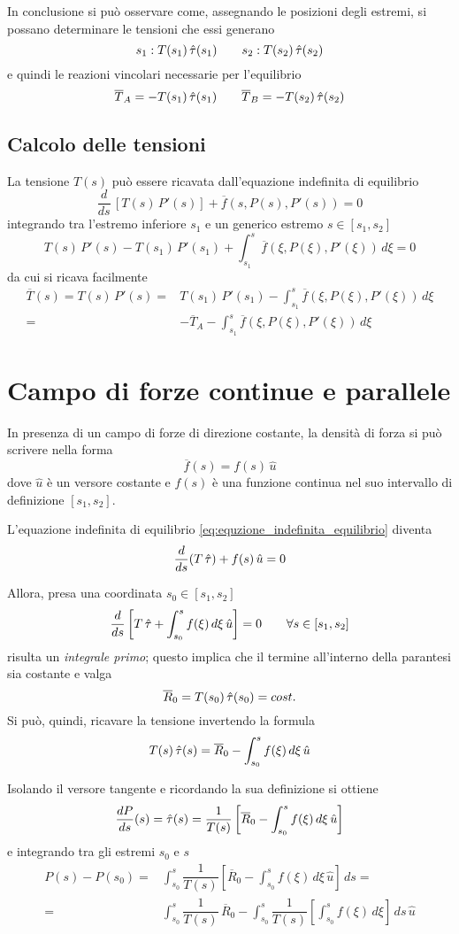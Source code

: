 In conclusione si può osservare come, assegnando le posizioni degli estremi, si possano determinare le tensioni che essi generano
\[
s_1: T(s_1)\,\hat{\tau}(s_1)\qquad s_2: T(s_2)\,\hat{\tau}(s_2)
\]
e quindi le reazioni vincolari necessarie per l'equilibrio
\[
\overline{T}_A = -	T(s_1)\,\hat{\tau}(s_1)\qquad \overline{T}_B = -T(s_2)\,\hat{\tau}(s_2)
\]

\subsection{Calcolo delle tensioni}
La tensione $T(s)$ può essere ricavata dall'equazione indefinita di equilibrio 
\[
\dfrac{d}{ds}\,\left[T(s)\,P'(s)\right] + \overline{f}(s, P(s), P'(s)) = 0
\] 
integrando tra l'estremo inferiore $s_1$ e un generico estremo $s \in [s_1, s_2]$
\[
T(s)\,P'(s) - T(s_1)\,P'(s_1) + \int_{s_1}^s \overline{f}(\xi, P(\xi), P'(\xi))\,d\xi = 0
\]
da cui si ricava facilmente
\begin{align*}
\overline{T}	(s) = T(s)\,P'(s) =& T(s_1)\,P'(s_1) - \int_{s_1}^s \overline{f}(\xi, P(\xi), P'(\xi))\,d\xi\\
=& - \overline{T}_A - \int_{s_1}^s \overline{f}(\xi, P(\xi), P'(\xi))\,d\xi 
\end{align*}



\section{Campo di forze continue e parallele}\label{section:forze_continue_parallele}
In presenza di un campo di forze di direzione costante, la densità di forza si può scrivere nella forma
\[
\overline{f}(s)	= f(s)\,\hat{u}
\]
dove $\hat{u}$ è un versore costante e $f(s)$ è una funzione continua nel suo intervallo di definizione $[s_1, s_2]$.

L'equazione indefinita di equilibrio \eqref{eq:equzione_indefinita_equilibrio} diventa
\[
\dfrac{d}{ds}	(T\,\hat{\tau}) + f(s)\,\hat{u} = 0
\]

Allora, presa una coordinata $s_0 \in[s_1, s_2]$ 
\[
\dfrac{d}{ds}	\left[ T\,\hat{\tau} + \int_{s_0}^s f(\xi)\,d\xi\,\hat{u}\right] = 0\qquad \forall s\in[s_1, s_2]
\]
risulta un \emph{integrale primo}; questo implica che il termine all'interno della parantesi sia costante e valga
\[
\overline{R}_0 = T(s_0)	\,\hat{\tau}(s_0) = cost.
\]
 Si può, quindi, ricavare la tensione invertendo la formula
 \[
T(s)\,\hat{\tau}(s) = \overline{R}_0 - \int_{s_0}^s f(\xi)\,d\xi\,\hat{u}	 
 \]
 
 Isolando il versore tangente e ricordando la sua definizione si ottiene
 \[
\dfrac{dP}{ds}(s)	 = \hat{\tau} (s) = \dfrac{1}{T(s)}\left[\overline{R}_0 - \int_{s_0}^s f(\xi)\,d\xi\,\hat{u}\right]
 \]
e integrando tra gli estremi $s_0$ e $s$
\begin{align*}
P(s)	 - P(s_0) =& \int_{s_0}^s \dfrac{1}{T(s)}\left[\overline{R}_0 - \int_{s_0}^s f(\xi)\,d\xi\,\hat{u}\right]\,ds = \\
=& \int_{s_0}^s \dfrac{1}{T(s)}\,\overline{R}_0 - \int_{s_0}^s \dfrac{1}{T(s)}\left[\int_{s_0}^s f(\xi)\,d\xi\right]\,ds\,\hat{u}
\end{align*}

